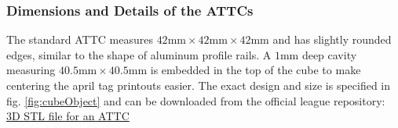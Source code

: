 %
%
%
%
%


\subsubsection{Dimensions and Details of the ATTCs}

The standard ATTC measures $42\si{\milli\meter} \times 42\si{\milli\meter} \times 42 \si{\milli\meter}$ and has slightly rounded edges, similar to the shape of aluminum profile rails. 
A $1\si{\milli\meter}$ deep cavity measuring $40.5\si{\milli\meter} \times 40.5\si{\milli\meter}$ is embedded in the top of the cube to make centering the april tag printouts easier.
The exact design and size is specified in fig. \ref{fig:cubeObject} and can be downloaded from the official league repository: \href{https://github.com/robocup-at-work/rulebook/tree/alpha_2023/images}{3D STL file for an ATTC}

